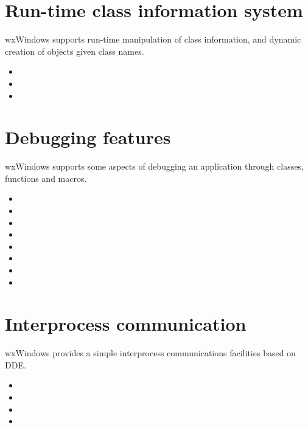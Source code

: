 \section{Run-time class information system}


wxWindows supports run-time manipulation of class information, and dynamic
creation of objects given class names.

\begin{itemize}\itemsep=0pt
\item {}
\item {}
\item {}
\end{itemize}

\section{Debugging features}


wxWindows supports some aspects of debugging an application through
classes, functions and macros.

\begin{itemize}\itemsep=0pt
\item {}
\item {}
\item {}
\item {}
\item {}
\item {}
\item {}
\item {}
\end{itemize}

\section{Interprocess communication}


wxWindows provides a simple interprocess communications facilities
based on DDE.

\begin{itemize}\itemsep=0pt
\item {}
\item {}
\item {}
\item {}
\end{itemize}

